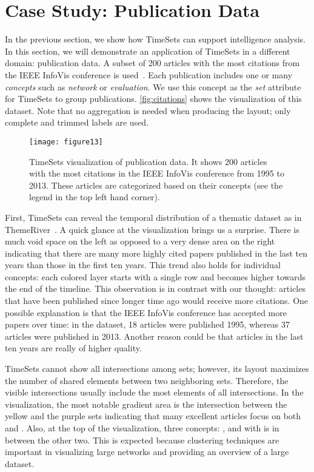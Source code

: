 \section{Case Study: Publication Data}
\label{sub:ts-pub}
In the previous section, we show how TimeSets can support intelligence analysis. In this section, we will demonstrate an application of TimeSets in a different domain: publication data. A subset of 200 articles with the most citations from the IEEE InfoVis conference is used~\cite{Stasko2013}. Each publication includes one or many \emph{concepts} such as \emph{network} or \emph{evaluation}. We use this concept as the \emph{set} attribute for TimeSets to group publications. \autoref{fig:citations} shows the visualization of this dataset. Note that no aggregation is needed when producing the layout; only complete and trimmed labels are used.

\begin{figure}[!htb]
\centering
\texttt{[image: figure13]}
\caption{TimeSets visualization of publication data. It shows 200 articles with the most citations in the IEEE InfoVis conference from 1995 to 2013. These articles are categorized based on their concepts (see the legend in the top left hand corner).}
\label{fig:citations}
\end{figure}

First, TimeSets can reveal the temporal distribution of a thematic dataset as in ThemeRiver~\cite{Havre2002}. A quick glance at the visualization brings us a surprise. There is much void space on the left as opposed to a very dense area on the right indicating that there are many more highly cited papers published in the last ten years than those in the first ten years. This trend also holds for individual concepts: each colored layer starts with a single row and becomes higher towards the end of the timeline. This observation is in contrast with our thought: articles that have been published since longer time ago would receive more citations. One possible explanation is that the IEEE InfoVis conference has accepted more papers over time: in the dataset, 18 articles were published 1995, whereas 37 articles were published in 2013. Another reason could be that articles in the last ten years are really of higher quality.

TimeSets cannot show all intersections among sets; however,  its layout maximizes the number of shared elements between two neighboring sets. Therefore, the visible intersections usually include the most elements of all intersections. In the visualization, the most notable gradient area is the intersection between the yellow and the purple sets indicating that many excellent articles focus on both \tsevaluation{} and \tsinteraction. Also, at the top of the visualization, three concepts: \tsnetwork, \tsclustering{} and \tsoverview{} with \tsclustering{} is in between the other two. This is expected because clustering techniques are important in visualizing large networks and providing an  overview of a large dataset.

